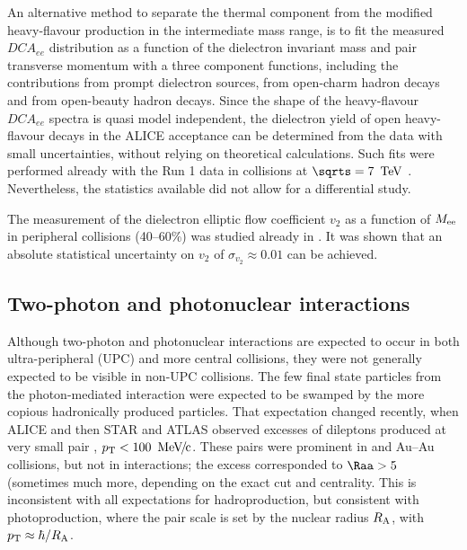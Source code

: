 \documentclass[../report.tex]{subfiles}
\begin{document}
An alternative method to separate the thermal component from the modified heavy-flavour production in the intermediate mass range, is to fit the measured $DCA_{ee}$ distribution as a function of the dielectron invariant mass and pair transverse momentum with a three component functions, including the contributions from prompt dielectron sources, from open-charm hadron decays and from open-beauty hadron decays. Since the shape of the heavy-flavour $DCA_{ee}$ spectra is quasi model independent, the dielectron yield of open heavy-flavour decays in the ALICE acceptance can be determined from the data with small uncertainties, without relying on theoretical calculations. Such fits were performed already with the Run 1 data in \pp{} collisions at $\sqrts = \unit[7]{\UTeV}$ \cite{Acharya:2018ohw}. Nevertheless, the statistics available did not allow for a differential study.    

The measurement of the dielectron elliptic flow coefficient $v_2$ as a function of $M_{\rm ee}$ in peripheral \PbPb{} collisions (40--60\%) was studied already in \cite{Abelevetal:2014cna}. It was shown that an absolute statistical uncertainty on $v_2$ of $\sigma_{v_2} \approx 0.01$ can be achieved.

\subsection{Two-photon and photonuclear interactions}
\label{sec:dileptons:peripheral}

Although two-photon and photonuclear interactions are expected to occur in both ultra-peripheral (UPC) and more central collisions, they were not generally expected to be visible in non-UPC collisions.  The few final state particles from the photon-mediated interaction were expected to be swamped by the more copious hadronically produced particles.   That expectation changed recently, when ALICE \cite{Adam:2015gba} and then STAR \cite{Adam:2018tdm,Zha:2018ohg} and ATLAS \cite{Aaboud:2018eph} observed excesses of dileptons produced at very small pair \pT, $\pT < \unit[100]{\UMeVc}$.   These pairs were prominent in \PbPb{} and Au--Au collisions, but not in \pp{} interactions; the excess corresponded to $\Raa >5$ (sometimes much more, depending on the exact cut and centrality.  This is inconsistent with all expectations for hadroproduction, but  consistent with photoproduction, where the pair \pT{} scale is set by the nuclear radius $R_{\rm A}$, with $p\sb{\scriptstyle\mathrm{T}} \approx \hbar/R_{\rm A}$. 
\end{document}
